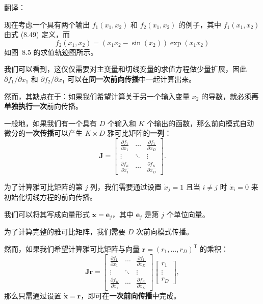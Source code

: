 \documentclass{article}
\begin{document}
{\color{red}
翻译：%

现在考虑一个具有两个输出 $f_1(x_1, x_2)$ 和 $f_2(x_1, x_2)$ 的例子，其中 $f_1(x_1, x_2)$ 由式 (8.49) 定义，而
\begin{equation}
f_2(x_1, x_2) = (x_1 x_2 - \sin(x_2)) \exp(x_1 x_2)
\tag{8.65}
\end{equation}
如图~8.5 的求值轨迹图所示。

我们可以看到，这仅仅需要对主变量和切线变量的求值方程做少量扩展，因此 $\partial f_1 / \partial x_1$ 和 $\partial f_2 / \partial x_1$ 可以在\textbf{同一次前向传播}中一起计算出来。

然而，其缺点在于：如果我们希望计算关于另一个输入变量 $x_2$ 的导数，就必须\textbf{再单独执行一次}前向传播。

一般地，如果我们有一个具有 $D$ 个输入和 $K$ 个输出的函数，那么前向模式自动微分的\textbf{一次传播}可以产生 $K \times D$ 雅可比矩阵的\textbf{一列}：
\begin{equation}
\mathbf{J} =
\begin{bmatrix}
\displaystyle \frac{\partial f_1}{\partial x_1} & \cdots & \displaystyle \frac{\partial f_1}{\partial x_D} \\
\vdots & \ddots & \vdots \\
\displaystyle \frac{\partial f_K}{\partial x_1} & \cdots & \displaystyle \frac{\partial f_K}{\partial x_D}
\end{bmatrix}.
\tag{8.66}
\end{equation}

为了计算雅可比矩阵的第 $j$ 列，我们需要通过设置 $\dot{x}_j = 1$ 且当 $i \ne j$ 时 $\dot{x}_i = 0$ 来初始化切线方程的前向传播。

我们可以将其写成向量形式 $\dot{\mathbf{x}} = \mathbf{e}_j$，其中 $\mathbf{e}_j$ 是第 $j$ 个单位向量。

为了计算完整的雅可比矩阵，我们需要 $D$ 次前向模式传播。

然而，如果我们希望计算雅可比矩阵与向量 $\mathbf{r} = (r_1, \dots, r_D)^{\mathsf{T}}$ 的乘积：
\begin{equation}
\mathbf{J}\mathbf{r} = 
\begin{bmatrix}
\displaystyle \frac{\partial f_1}{\partial x_1} & \cdots & \displaystyle \frac{\partial f_1}{\partial x_D} \\
\vdots & \ddots & \vdots \\
\displaystyle \frac{\partial f_K}{\partial x_1} & \cdots & \displaystyle \frac{\partial f_K}{\partial x_D}
\end{bmatrix}
\begin{bmatrix}
r_1 \\ \vdots \\ r_D
\end{bmatrix},
\tag{8.67}
\end{equation}
那么只需通过设置 $\dot{\mathbf{x}} = \mathbf{r}$，即可在\textbf{一次前向传播}中完成。
}
\end{document}
